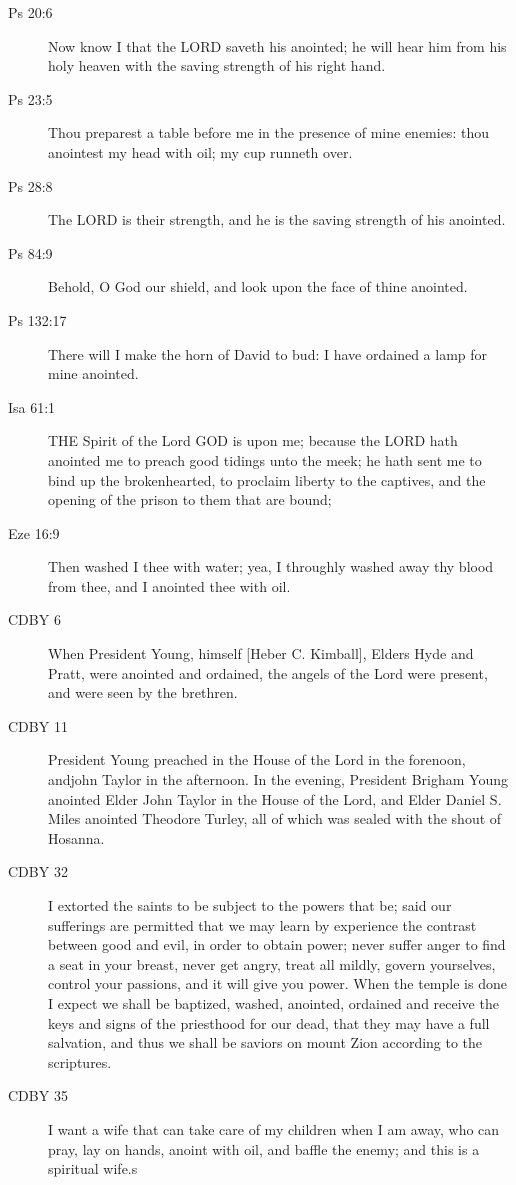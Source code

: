 \begin{description}
		\item[Ps 20:6] Now know I that the LORD saveth his anointed; he will hear him from his holy heaven with the saving strength of his right hand.
		\item[Ps 23:5] Thou preparest a table before me in the presence of mine enemies: thou anointest my head with oil; my cup runneth over.
		\item[Ps 28:8] The LORD is their strength, and he is the saving strength of his anointed.
		\item[Ps 84:9] Behold, O God our shield, and look upon the face of thine anointed.
		\item[Ps 132:17] There will I make the horn of David to bud: I have ordained a lamp for mine anointed.
		\item[Isa 61:1] THE Spirit of the Lord GOD is upon me; because the LORD hath anointed me to preach good tidings unto the meek; he hath sent me to bind up the brokenhearted, to proclaim liberty to the captives, and the opening of the prison to them that are bound;
		\item[Eze 16:9] Then washed I thee with water; yea, I throughly washed away thy blood from thee, and I anointed thee with oil.
		\item[CDBY 6] When President Young, himself [Heber C. Kimball], Elders Hyde and Pratt, were anointed and ordained, the angels of the Lord were present, and were seen by the brethren.
		\item[CDBY 11] President Young preached in the House of the Lord in the forenoon, andjohn Taylor in the afternoon. In the evening, President Brigham Young anointed Elder John Taylor in the House of the Lord, and Elder Daniel S. Miles anointed Theodore Turley, all of which was sealed with the shout of Hosanna.
		\item[CDBY 32] I extorted the saints to be subject to the powers that be; said our sufferings are permitted that we may learn by experience the contrast between good and evil, in order to obtain power; never suffer anger to find a seat in your breast, never get angry, treat all mildly, govern yourselves, control your passions, and it will give you power. When the temple is done I expect we shall be baptized, washed, anointed, ordained and receive the keys and signs of the priesthood for our dead, that they may have a full salvation, and thus we shall be saviors on mount Zion according to the scriptures.
		\item[CDBY 35] I want a wife that can take care of my children when I am away, who can pray, lay on hands, anoint with oil, and baffle the enemy; and this is a spiritual wife.s
		\end{description}
		
